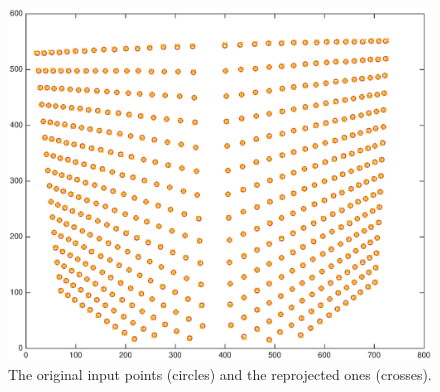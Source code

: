 \documentclass[a4paper]{article}
\begin{document}
\begin{figure}[h]
\centering
\includegraphics[width=\textwidth]{result.eps}
\caption{The original input points (circles) and the reprojected ones (crosses).}
\end{figure}
\end{document}
